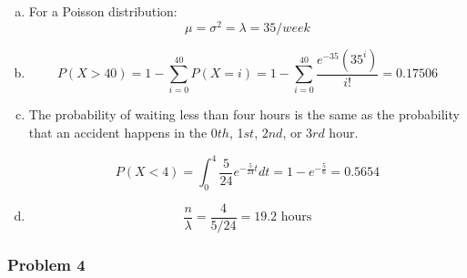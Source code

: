 \documentclass[11pt]{extarticle}
\begin{document}
\begin{enumerate}[(a)]
\item  For a Poisson distribution: $$\mu = \sigma^2 = \lambda = 35/week $$


\item $$P(X > 40) = 1 - \sum_{i=0}^{40} P(X = i) = 1 - \sum_{i=0}^{40} \frac{e^{-35}(35^i)}{i!} = \boxed{0.17506}$$



\item The probability of waiting less than four hours is the same as the probability that an accident happens in the 0$th$, 1$st$, 2$nd$, or 3$rd$ hour.








 $$ P(X < 4) = \int_{0}^4 \frac{5}{24} e^{-\frac{5}{24}t} dt = 1-e^{-\frac{5}{6}} = \boxed{0.5654}$$
 



\item $$ \frac{n}{\lambda} = \frac{4}{5/24} = \boxed{19.2 \text{\ hours}} $$

\end{enumerate}

\subsubsection*{Problem 4}
\end{document}
